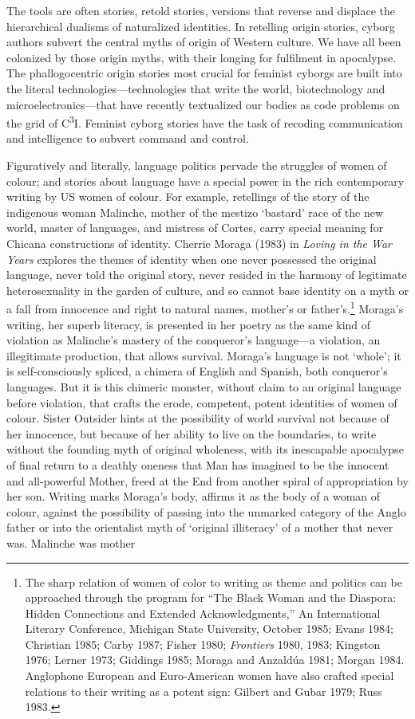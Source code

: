 \documentclass[DIV=12,%
               BCOR=10mm,%
               headinclude=false,%
               footinclude=false,open=any,%
               fontsize=11pt,%
               twoside,%
               paper=210mm:11in]%
               {scrbook}
\begin{document}
The tools are often stories, retold stories, versions that reverse and displace the hierarchical dualisms of naturalized identities. In retelling origin stories, cyborg authors subvert the central myths of origin of Western culture. We have all been colonized by those origin myths, with their longing for fulfilment in apocalypse. The phallogocentric origin stories most crucial for feminist cyborgs are built into the literal technologies—technologies that write the world, biotechnology and microelectronics—that have recently textualized our bodies as code problems on the grid of C\textsuperscript{3}I. Feminist cyborg stories have the task of recoding communication and intelligence to subvert command and control.


Figuratively and literally, language politics pervade the struggles of women of colour; and stories about language have a special power in the rich contemporary writing by US women of colour. For example, retellings of the story of the indigenous woman Malinche, mother of the mestizo ‘bastard’ race of the new world, master of languages, and mistress of Cortes, carry special meaning for Chicana constructions of identity. Cherrie Moraga (1983) in \emph{Loving in the War Years} explores the themes of identity when one never possessed the original language, never told the original story, never resided in the harmony of legitimate heterosexuality in the garden of culture, and so cannot base identity on a myth or a fall from innocence and right to natural names, mother’s or father’s.\footnote{The sharp relation of women of color to writing as theme and politics can be approached through the program for “The Black Woman and the Diaspora: Hidden Connections and Extended Acknowledgments,” An International Literary Conference, Michigan State University, October 1985; Evans 1984; Christian 1985; Carby 1987; Fisher 1980; \emph{Frontiers} 1980, 1983; Kingston 1976; Lerner 1973; Giddings 1985; Moraga and Anzaldúa 1981; Morgan 1984. Anglophone European and Euro-American women have also crafted special relations to their writing as a potent sign: Gilbert and Gubar 1979; Russ 1983.} Moraga’s writing, her superb literacy, is presented in her poetry as the same kind of violation as Malinche’s mastery of the conqueror’s language—a violation, an illegitimate production, that allows survival. Moraga’s language is not ‘whole’; it is self-consciously spliced, a chimera of English and Spanish, both conqueror’s languages. But it is this chimeric monster, without claim to an original language before violation, that crafts the erode, competent, potent identities of women of colour. Sister Outsider hints at the possibility of world survival not because of her innocence, but because of her ability to live on the boundaries, to write without the founding myth of original wholeness, with its inescapable apocalypse of final return to a deathly oneness that Man has imagined to be the innocent and all-powerful Mother, freed at the End from another spiral of appropriation by her son. Writing marks Moraga’s body, affirms it as the body of a woman of colour, against the possibility of passing into the unmarked category of the Anglo father or into the orientalist myth of ‘original illiteracy’ of a mother that never was. Malinche was mother 
\end{document}
